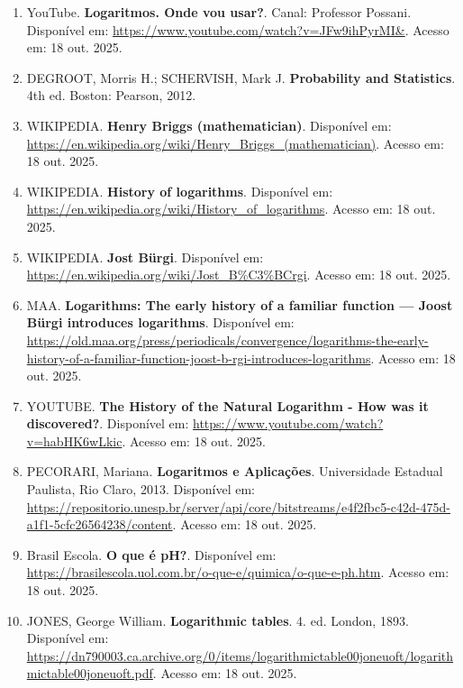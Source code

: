 \begin{enumerate}
\item YouTube. \textbf{Logaritmos. Onde vou usar?}. Canal: Professor Possani. Disponível em: \url{https://www.youtube.com/watch?v=JFw9ihPyrMI&}. Acesso em: 18 out. 2025.

\item DEGROOT, Morris H.; SCHERVISH, Mark J. \textbf{Probability and Statistics}. 4th ed. Boston: Pearson, 2012.

\item WIKIPEDIA. \textbf{Henry Briggs (mathematician)}. Disponível em: \url{https://en.wikipedia.org/wiki/Henry_Briggs_(mathematician)}. Acesso em: 18 out. 2025.

\item WIKIPEDIA. \textbf{History of logarithms}. Disponível em: \url{https://en.wikipedia.org/wiki/History_of_logarithms}. Acesso em: 18 out. 2025.

\item WIKIPEDIA. \textbf{Jost Bürgi}. Disponível em: \url{https://en.wikipedia.org/wiki/Jost_B%C3%BCrgi}. Acesso em: 18 out. 2025.

\item MAA. \textbf{Logarithms: The early history of a familiar function — Joost Bürgi introduces logarithms}. Disponível em: \url{https://old.maa.org/press/periodicals/convergence/logarithms-the-early-history-of-a-familiar-function-joost-b-rgi-introduces-logarithms}. Acesso em: 18 out. 2025.

\item YOUTUBE. \textbf{The History of the Natural Logarithm - How was it discovered?}. Disponível em: \url{https://www.youtube.com/watch?v=habHK6wLkic}. Acesso em: 18 out. 2025.

\item PECORARI, Mariana. \textbf{Logaritmos e Aplicações}. Universidade Estadual Paulista, Rio Claro, 2013. Disponível em: \url{https://repositorio.unesp.br/server/api/core/bitstreams/e4f2fbc5-c42d-475d-a1f1-5cfc26564238/content}. Acesso em: 18 out. 2025.

\item Brasil Escola. \textbf{O que é pH?}. Disponível em: \url{https://brasilescola.uol.com.br/o-que-e/quimica/o-que-e-ph.htm}. Acesso em: 18 out. 2025.

\item JONES, George William. \textbf{Logarithmic tables}. 4. ed. London, 1893. Disponível em: \url{https://dn790003.ca.archive.org/0/items/logarithmictable00joneuoft/logarithmictable00joneuoft.pdf}. Acesso em: 18 out. 2025.


\end{enumerate}
